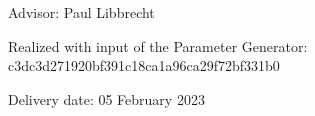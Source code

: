 \vspace*{5mm}

\begin{large} 
\begin{center}
Advisor: Paul Libbrecht
\end{center}
\end{large} 

\begin{large} 
\begin{center}
Realized with input of the Parameter Generator: c3dc3d271920bf391c18ca1a96ca29f72bf331b0
\end{center}
\end{large} 



\vspace*{-6mm}

\begin{large} 
\begin{center}
Delivery date: 05 February 2023
\end{center}
\end{large} 


\pagestyle{empty} %